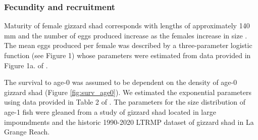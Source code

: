 \documentclass[preprint,review,12pt,authoryear]{elsarticle}
\begin{document}

\subsubsection{Fecundity and recruitment}
Maturity of female gizzard shad corresponds with lengths of approximately 140 mm and the number of eggs produced increase as the females increase in size \citep{jons1997ovarian}.  
The mean eggs produced per female was described by a three-parameter logistic function (see Figure 1) whose parameters were estimated from data provided in Figure 1a. of \citep{jons1997ovarian}. 

The survival to age-0 was assumed to be dependent on the density of age-0 gizzard shad (Figure \ref{fig:surv_age0}).  
We estimated the exponential parameters using data provided in Table 2 of \citep{michaletz2010overwinter}. 
The parameters for the size distribution of age-1 fish were gleaned from a study of gizzard shad located in large impoundments \citep{michaletz2017variation} and the historic 1990-2020 LTRMP dataset of gizzard shad in La Grange Reach.
\end{document}
